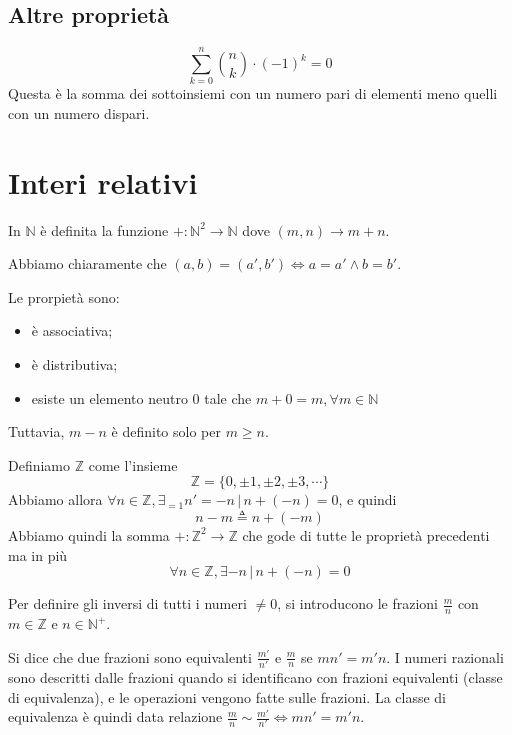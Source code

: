 \documentclass[a4paper]{article}
\begin{document}
\subsection{Altre proprietà}

\[
    \sum_{k=0}^n \binom{n}{k}\cdot {(-1)}^k = 0
\]
Questa è la somma dei sottoinsiemi con un numero pari di elementi meno quelli con un numero dispari.

\pagebreak

\section{Interi relativi}

In \(\mathbb{N}\) è definita la funzione \(+\colon {\mathbb{N}}^2 \to \mathbb{N}\)
dove \((m,n) \to m+n\).

Abbiamo chiaramente che \((a,b) = (a', b') \iff a=a' \land b=b'\).

Le prorpietà sono:
\begin{itemize}
    \item è associativa;
    \item è distributiva;
    \item esiste un elemento neutro \(0\) tale che \(m+0=m, \forall m \in \mathbb{N}\)
\end{itemize}

Tuttavia, \(m-n\) è definito solo per \(m \geq n\).

Definiamo \(\mathbb{Z}\) come l'insieme 
\[
    \mathbb{Z} = \{ 0, \pm 1, \pm 2, \pm 3, \cdots \}
\]
Abbiamo allora \(\forall n \in \mathbb{Z}, \exists_{=1} n'=-n \,|\, n+(-n) = 0\),
e quindi
\[
    n-m \triangleq n + (-m)
\]
Abbiamo quindi la somma \(+\colon {\mathbb{Z}}^2 \to \mathbb{Z}\)
che gode di tutte le proprietà precedenti ma in più 
\[
    \forall n \in \mathbb{Z}, \exists -n \,|\, n+(-n) = 0
\]

Per definire gli inversi di tutti i numeri \(\neq 0\), si introducono le frazioni \(\frac{m}{n}\)
con \(m\in\mathbb{Z}\) e \(n\in{\mathbb{N}}^+\).

Si dice che due frazioni sono equivalenti \(\frac{m'}{n'}\) e \(\frac{m}{n}\)
se \(mn' = m'n\).
I numeri razionali sono descritti dalle frazioni quando si identificano
con frazioni equivalenti (classe di equivalenza), e le operazioni vengono fatte sulle frazioni.
La classe di equivalenza è quindi data relazione \(\frac{m}{n} \sim \frac{m'}{n'} \iff mn'=m'n\).
\end{document}
